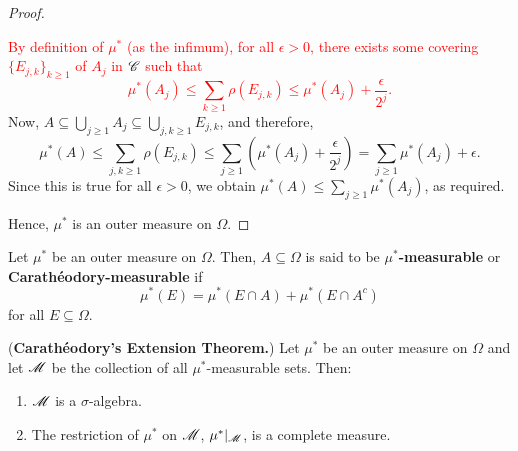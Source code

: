 \begin{proof}
\begin{enumerate}
        \textcolor{red}{By definition of $\mu^*$ (as the infimum), for all $\epsilon > 0 $, there exists some covering $\{E_{j, k}\}_{k \geq 1}$ of $A_j$ in $\mathscr{C}$ such that
        \[ \mu^*(A_j) \leq \sum_{k \geq 1} \rho(E_{j, k}) \leq \mu^*(A_j) + \frac{\epsilon}{2^j}. \]}
        Now, $A \subseteq \bigcup_{j \geq 1} A_j \subseteq \bigcup_{j, k \geq 1} E_{j, k}$, and therefore,
        \[ \mu^*(A) \leq \sum_{j, k \geq 1} \rho(E_{j, k}) \leq \sum_{j \geq 1} \left( \mu^*(A_j) + \frac{\epsilon}{2^j} \right) = \sum_{j \geq 1} \mu^*(A_j) + \epsilon .\]
        Since this is true for all $\epsilon > 0$, we obtain $\mu^*(A) \leq \sum_{j \geq 1} \mu^*(A_j)$, as required. 
    \end{enumerate}
    Hence, $\mu^*$ is an outer measure on $\Omega$. 
\end{proof}

\newpage

\begin{definition}
        Let $\mu^*$ be an outer measure on $\Omega$. Then, $A \subseteq \Omega$ is said to be \textbf{$\mu^*$-measurable} or \textbf{Carathéodory-measurable} if
        \[ \mu^*(E) = \mu^*(E \cap A) + \mu^*(E \cap A^c) \]
        for all $E \subseteq \Omega$.    
\end{definition}

\begin{theorem} (\textbf{Carathéodory's Extension Theorem.})
        Let $\mu^*$ be an outer measure on $\Omega$ and let $\mathscr{M}$ be the collection of all $\mu^*$-measurable sets. Then:        
        \begin{enumerate}
            \item $\mathscr{M}$ is a $\sigma$-algebra.
            \item The restriction of $\mu^*$ on $\mathscr{M}$, $\mu^*|_{\mathscr{M}}$, is a complete measure.
        \end{enumerate}
\end{theorem}
        
